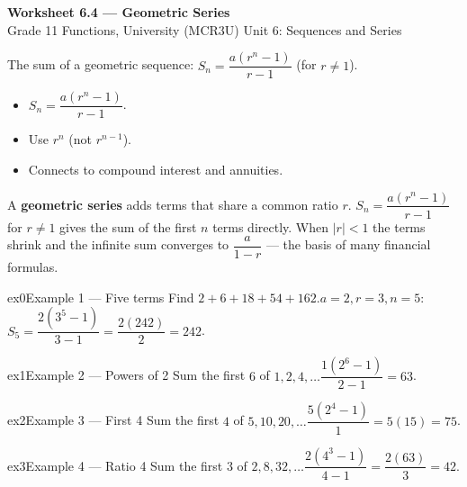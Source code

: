 \documentclass[11pt]{article}
\begin{document}
\begin{center}
{\LARGE\bfseries\color{titleblue}Worksheet 6.4 --- Geometric Series}\\[2pt]
{\small Grade 11 Functions, University (MCR3U) \textperiodcentered{} Unit 6: Sequences and Series}
\end{center}

\begin{ideabox}
The sum of a geometric sequence: $S_n=\dfrac{a(r^{n}-1)}{r-1}$ (for $r\ne1$).
\begin{itemize}[leftmargin=*,itemsep=2pt]
  \item $S_n=\dfrac{a(r^{n}-1)}{r-1}$.
  \item Use $r^{n}$ (not $r^{n-1}$).
  \item Connects to compound interest and annuities.
\end{itemize}
\end{ideabox}

\begin{learnbox}
A \textbf{geometric series} adds terms that share a common ratio $r$.
$S_n=\dfrac{a(r^n-1)}{r-1}$ for $r\ne1$ gives the sum of the first $n$ terms directly.
When $|r|<1$ the terms shrink and the infinite sum converges to $\dfrac{a}{1-r}$ — the basis of many financial formulas.
\end{learnbox}


\begin{example}{ex0}{Example 1 --- Five terms}
Find $2+6+18+54+162$.\soln $a=2,r=3,n=5$: $S_5=\dfrac{2(3^{5}-1)}{3-1}=\dfrac{2(242)}{2}=242$.
\end{example}

\begin{example}{ex1}{Example 2 --- Powers of 2}
Sum the first $6$ of $1,2,4,\dots$\soln $\dfrac{1(2^{6}-1)}{2-1}=63$.
\end{example}

\begin{example}{ex2}{Example 3 --- First 4}
Sum the first $4$ of $5,10,20,\dots$\soln $\dfrac{5(2^{4}-1)}{1}=5(15)=75$.
\end{example}

\begin{example}{ex3}{Example 4 --- Ratio 4}
Sum the first $3$ of $2,8,32,\dots$\soln $\dfrac{2(4^{3}-1)}{4-1}=\dfrac{2(63)}{3}=42$.
\end{example}
\end{document}
